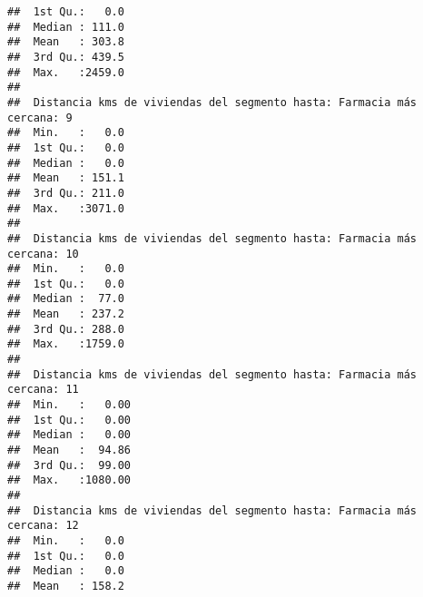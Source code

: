 \documentclass[11pt,]{article}
\begin{document}
\begin{verbatim}
##  1st Qu.:   0.0                                                        
##  Median : 111.0                                                        
##  Mean   : 303.8                                                        
##  3rd Qu.: 439.5                                                        
##  Max.   :2459.0                                                        
##                                                                        
##  Distancia kms de viviendas del segmento hasta: Farmacia más cercana: 9
##  Min.   :   0.0                                                        
##  1st Qu.:   0.0                                                        
##  Median :   0.0                                                        
##  Mean   : 151.1                                                        
##  3rd Qu.: 211.0                                                        
##  Max.   :3071.0                                                        
##                                                                        
##  Distancia kms de viviendas del segmento hasta: Farmacia más cercana: 10
##  Min.   :   0.0                                                         
##  1st Qu.:   0.0                                                         
##  Median :  77.0                                                         
##  Mean   : 237.2                                                         
##  3rd Qu.: 288.0                                                         
##  Max.   :1759.0                                                         
##                                                                         
##  Distancia kms de viviendas del segmento hasta: Farmacia más cercana: 11
##  Min.   :   0.00                                                        
##  1st Qu.:   0.00                                                        
##  Median :   0.00                                                        
##  Mean   :  94.86                                                        
##  3rd Qu.:  99.00                                                        
##  Max.   :1080.00                                                        
##                                                                         
##  Distancia kms de viviendas del segmento hasta: Farmacia más cercana: 12
##  Min.   :   0.0                                                         
##  1st Qu.:   0.0                                                         
##  Median :   0.0                                                         
##  Mean   : 158.2                                                         

\end{verbatim}
\end{document}
